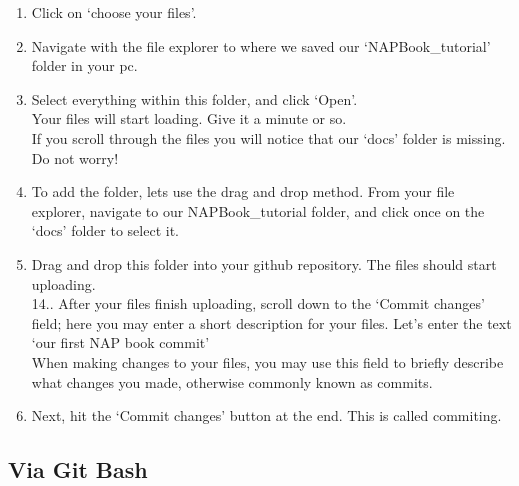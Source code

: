 \documentclass[
]{book}
\providecommand{\tightlist}{%
  \setlength{\itemsep}{0pt}\setlength{\parskip}{0pt}}
\begin{document}
\begin{enumerate}
\def\labelenumi{\arabic{enumi}.}
\setcounter{enumi}{8}
\tightlist
\item
  Click on `choose your files'.\\
\item
  Navigate with the file explorer to where we saved our `NAPBook\_tutorial' folder in your pc.\\
\item
  Select everything within this folder, and click `Open'.\\
  Your files will start loading. Give it a minute or so.\\
  If you scroll through the files you will notice that our `docs' folder is missing. Do not worry!\\
\item
  To add the folder, lets use the drag and drop method. From your file explorer, navigate to our NAPBook\_tutorial folder, and click once on the `docs' folder to select it.\\
\item
  Drag and drop this folder into your github repository. The files should start uploading.\\
  14.. After your files finish uploading, scroll down to the `Commit changes' field; here you may enter a short description for your files. Let's enter the text `our first NAP book commit'\\
  When making changes to your files, you may use this field to briefly describe what changes you made, otherwise commonly known as commits.\\
\item
  Next, hit the `Commit changes' button at the end. This is called commiting.
\end{enumerate}

\hypertarget{via-git-bash}{%
\subsection{Via Git Bash}\label{via-git-bash}}
\end{document}
